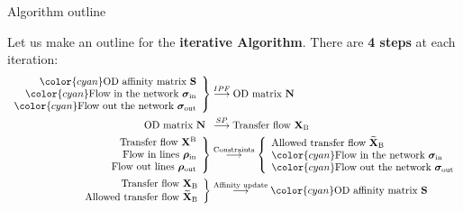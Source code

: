 \documentclass[10pt]{beamer}
\newcommand{\imp}[1]{\textbf{\color{cyan}#1}}
\begin{document}
	\begin{frame}{Algorithm outline}
		
		Let us make an outline for the \imp{iterative Algorithm}. There are \imp{4 steps} at each iteration: \\
		\footnotesize
		\begin{align}
			\left. \begin{array}{r} 
				{\color{cyan} \text{OD affinity matrix } \mathbf{S}} \\
				{\color{cyan} \text{Flow in the network } \bm{\sigma}_\text{in}} \\
				{\color{cyan} \text{Flow out the network } \bm{\sigma}_\text{out}}
			\end{array} \right\}  &\overset{IPF}{\longrightarrow} \text{OD matrix } \mathbf{N} \\
			\begin{array}{r}
			\text{OD matrix } \mathbf{N}
			\end{array} &\overset{SP}{\longrightarrow} \text{Transfer flow } \mathbf{X}_\text{B} \\
			\left. \begin{array}{r} 
			\text{Transfer flow } \mathbf{X}^\text{B} \\
			\text{Flow in lines } \bm{\rho}_\text{in} \\
			\text{Flow out lines } \bm{\rho}_\text{out}
			\end{array} \right\}  &\overset{\text{Constraints}}{\longrightarrow} 
			\left\{ \begin{array}{l}
			\text{Allowed transfer flow } \widetilde{\mathbf{X}}_\text{B} \\
			{\color{cyan} \text{Flow in the network } \bm{\sigma}_\text{in}} \\
			{\color{cyan} \text{Flow out the network } \bm{\sigma}_\text{out}}
			\end{array} \right. \\
			\left. \begin{array}{r} 
			\text{Transfer flow } \mathbf{X}_\text{B} \\
			 \text{Allowed transfer flow } \widetilde{\mathbf{X}}_\text{B}
			\end{array} \right\}  &\overset{\text{Affinity update}}{\longrightarrow} {\color{cyan} \text{OD affinity matrix } \mathbf{S}}
		\end{align}	
	\end{frame}
	
	
\end{document}
